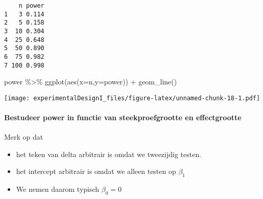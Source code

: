 \documentclass[
]{article}
\newenvironment{Shaded}{\begin{snugshade}}{\end{snugshade}}
\newcommand{\AttributeTok}[1]{\textcolor[rgb]{0.77,0.63,0.00}{#1}}
\newcommand{\FunctionTok}[1]{\textcolor[rgb]{0.00,0.00,0.00}{#1}}
\newcommand{\NormalTok}[1]{#1}
\newcommand{\SpecialCharTok}[1]{\textcolor[rgb]{0.00,0.00,0.00}{#1}}
\providecommand{\tightlist}{%
  \setlength{\itemsep}{0pt}\setlength{\parskip}{0pt}}
\begin{document}
\begin{verbatim}
    n power
1   3 0.114
2   5 0.158
3  10 0.304
4  25 0.648
5  50 0.890
6  75 0.982
7 100 0.998
\end{verbatim}

\begin{Shaded}
\begin{Highlighting}[]
\NormalTok{power }\SpecialCharTok{\%\textgreater{}\%} 
  \FunctionTok{ggplot}\NormalTok{(}\FunctionTok{aes}\NormalTok{(}\AttributeTok{x=}\NormalTok{n,}\AttributeTok{y=}\NormalTok{power)) }\SpecialCharTok{+}
  \FunctionTok{geom\_line}\NormalTok{()}
\end{Highlighting}
\end{Shaded}

\texttt{[image: experimentalDesignI\_files/figure-latex/unnamed-chunk-18-1.pdf]}

\hypertarget{bestudeer-power-in-functie-van-steekproefgrootte-en-effectgrootte}{%
\paragraph{Bestudeer power in functie van steekproefgrootte en
effectgrootte}\label{bestudeer-power-in-functie-van-steekproefgrootte-en-effectgrootte}}

Merk op dat

\begin{itemize}
\tightlist
\item
  het teken van delta arbitrair is omdat we tweezijdig testen.
\item
  het intercept arbitrair is omdat we alleen testen op \(\beta_1\)
\item
  We nemen daarom typisch \(\beta_0 = 0\)
\end{itemize}
\end{document}
